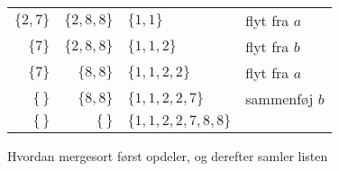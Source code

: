 \begin{figure}
\begin{center}
\begin{minipage}{0.55\textwidth}
\begin{flushright}
\begin{tabular}{rrl|l}
$\{2,7\}$ &$ \{2,8,8\}$ &  $ \{1,1\}$ & flyt fra $a$\\
$\{7\}$ &$ \{2,8,8\}$ &  $ \{1,1,2\}$ & flyt fra $b$\\
$\{7\}$ &$ \{8,8\}$ &  $ \{1,1,2,2\}$ & flyt fra $a$\\
$\{\,\}$ &$ \{8,8\}$ &  $ \{1,1,2,2,7\}$ & sammenføj $b$\\
$\{\,\}$ &$ \{\,\}$ &  $ \{1,1,2,2,7,8,8\}$ & \\
\end{tabular}
\end{flushright}
\end{minipage}
	\end{center}
	\caption{Hvordan mergesort først opdeler, og derefter samler listen}
	\label{fig:mergesort_procedure}
\end{figure}


